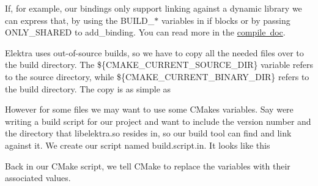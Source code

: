 If, for example, our bindings only support linking against a dynamic library we can express that, by using the {\ttfamily B\+U\+I\+L\+D\+\_\+$\ast$} variables in if blocks or by passing {\ttfamily O\+N\+L\+Y\+\_\+\+S\+H\+A\+R\+ED} to {\ttfamily add\+\_\+binding}. You can read more in the \mbox{\hyperlink{doc_COMPILE_md}{compile doc}}.


\begin{DoxyCode}{0}
\end{DoxyCode}


Elektra uses out-\/of-\/source builds, so we have to copy all the needed files over to the build directory. The \$\{C\+M\+A\+K\+E\+\_\+\+C\+U\+R\+R\+E\+N\+T\+\_\+\+S\+O\+U\+R\+C\+E\+\_\+\+D\+IR\} variable refers to the source directory, while \$\{C\+M\+A\+K\+E\+\_\+\+C\+U\+R\+R\+E\+N\+T\+\_\+\+B\+I\+N\+A\+R\+Y\+\_\+\+D\+IR\} refers to the build directory. The copy is as simple as


\begin{DoxyCode}{0}
\end{DoxyCode}


However for some files we may want to use some C\+Makes variables. Say we\textquotesingle{}re writing a build script for our project and want to include the version number and the directory that {\ttfamily libelektra.\+so} resides in, so our build tool can find and link against it. We create our script named {\ttfamily build.\+script.\+in}. It looks like this


\begin{DoxyCode}{0}
\end{DoxyCode}


Back in our C\+Make script, we tell C\+Make to replace the variables with their associated values.


\begin{DoxyCode}{0}
\end{DoxyCode}



